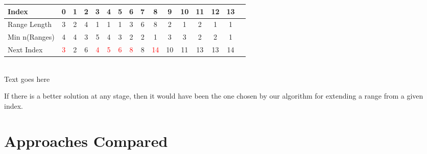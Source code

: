 \documentclass[11pt]{article}
\begin{document}
\begin{center}
  \begin{tabular}{|l|c|c|c|c|c|c|c|c|c|c|c|c|c|c|c|}
    \hline
    Index         & 0 & 1 & 2 & 3 & 4 & 5 & 6 & 7 & 8 & 9 &10 &11 &12 &13\\
    \hline
    Range Length  & 3 & 2 & 4 & 1 & 1 & 1 & 3 & 6 & 8 & 2 & 1 & 2 & 1 & 1\\
    \hline
    Min n(Ranges) & 4 & 4 & 3 & 5 & 4 & 3 & 2 & 2 & 1 & 3 & 3 & 2 & 2 & 1\\
    \hline
    Next Index    & \textcolor{red}{3} & 2 & 6 & \textcolor{red}{4} & \textcolor{red}{5} & \textcolor{red}{6} & \textcolor{red}{8} & 8 & \textcolor{red}{14} &10 &11 &13 &13 &14\\
    \hline
  \end{tabular}\\
  \vspace{0.3cm}
  Text goes here
\end{center}

If there is a better solution at any stage, then it would have been
the one chosen by our algorithm for extending a range from a given
index.


\section{Approaches Compared}



\clearpage
\end{document}
